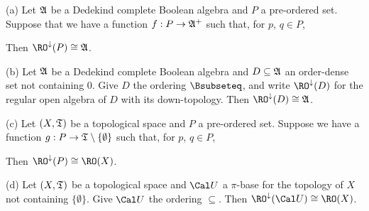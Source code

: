 (a) Let $\frak A$ be a Dedekind complete Boolean algebra and $P$ a
pre-ordered set.   Suppose that we have a function $f:P\to\frak A^+$ such
that, for $p$, $q\in P$,




\noindent Then $\RO^{\downarrow}(P)\cong\frak A$.

(b) Let $\frak A$ be a Dedekind complete Boolean algebra and
$D\subseteq\frak A$ an order-dense set not containing $0$.    Give $D$
the ordering $\Bsubseteq$, and write $\RO^{\downarrow}(D)$ for the
regular open algebra of $D$ with its
down-topology.   Then $\RO^{\downarrow}(D)\cong\frak A$.

(c) Let $(X,\frak T)$ be a topological space and $P$ a pre-ordered set.
Suppose we have a function $g:P\to\frak T\setminus\{\emptyset\}$ such that,
for $p$, $q\in P$,




\noindent Then $\RO^{\downarrow}(P)\cong\RO(X)$.

(d) Let $(X,\frak T)$ be a topological space and
$\Cal U$ a $\pi$-base for the topology of $X$ not containing
$\{\emptyset\}$.   Give $\Cal U$ the ordering $\subseteq$.
Then $\RO^{\downarrow}(\Cal U)\cong\RO(X)$.

